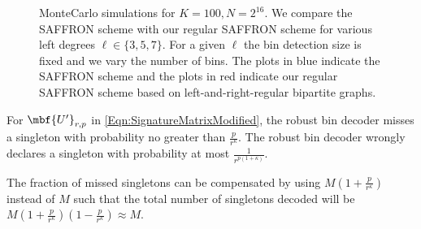 \documentclass[conference,twocolumn]{IEEEtran}
\newcommand*{\FigPath}{../Figures}
\begin{document}

\begin{figure}[t!]
\centering
\resizebox{\columnwidth}{!}{}
\caption{MonteCarlo simulations for $K=100, N=2^{16}$. We compare the SAFFRON scheme with our regular SAFFRON scheme for various left degrees $\ell\in\{3,5,7\}$. For a given $\ell$ the bin detection size is fixed and we vary the number of bins. The plots in blue indicate the SAFFRON scheme and the plots in red indicate our regular SAFFRON scheme based on left-and-right-regular bipartite graphs.}
\label{Fig:SimulationNoiseless}
\end{figure}

\begin{lemma}
For $\mbf{U'}_{r,p}$ in \eqref{Eqn:SignatureMatrixModified}, the robust bin decoder misses a singleton with probability no greater than $\frac{p}{r^{\kappa}}$. The robust bin decoder wrongly declares a singleton with probability at most $\frac{1}{r^{p(1+\kappa)}}$.
\end{lemma}
The fraction of missed singletons can be compensated by using $M(1+\frac{p}{r^{\kappa}})$ instead of $M$ such that the total number of singletons decoded will be $M(1+\frac{p}{r^{\kappa}})(1-\frac{p}{r^{\kappa}})\approx M$.
\end{document}
